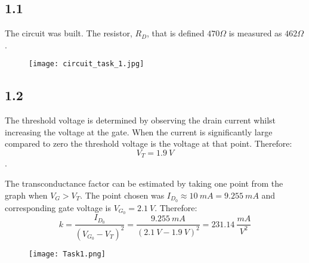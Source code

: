 \subsection*{1.1}
The circuit was built. The resistor, $R_D$, that is defined $470 \Omega$  is measured as $462 \Omega$.

    \begin{figure}[h!]
        \centering
        \texttt{[image: circuit\_task\_1.jpg]}
    \end{figure}

\subsection*{1.2}
The threshold voltage is determined by observing the drain current whilst increasing the voltage at the gate. When the current is significantly large compared to zero the threshold voltage is the voltage at that point. Therefore: $$V_T = 1.9 \ V$$.

The transconductance factor can be estimated by taking one point from the graph when $V_G > V_T$. The point chosen was $I_{D_0} \approx 10 \ mA = 9.255 \ mA $ and corresponding gate voltage is $V_{G_0} = 2.1 \ V$. Therefore: $$ k = \dfrac{I_{D_0}}{(V_{G_0}-V_T)^2} = \dfrac{9.255 \ mA}{(2.1 \ V - 1.9 \ V)^2} = 231.14 \ \dfrac{mA}{V^2} $$

\begin{figure}[h!]
        \centering
        \texttt{[image: Task1.png]}
\end{figure}







